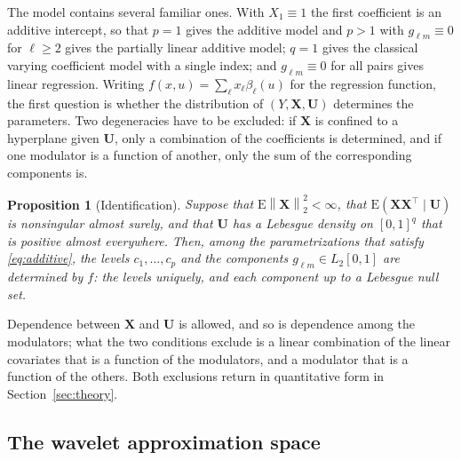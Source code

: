\documentclass[12pt]{article} %
\newtheorem{proposition}{Proposition}
\theoremstyle{definition}
\newcommand{\E}{\mathrm{E}}
\newcommand{\T}{^{\top}}
\newcommand{\norm}[1]{\left\lVert #1 \right\rVert}
\newcommand{\cv}{\ell}
\newcommand{\md}{m}
\newcommand{\bX}{\mathbf{X}}
\newcommand{\bU}{\mathbf{U}}
\newcommand{\fcoef}[1]{\beta_{#1}}
\newcommand{\lvl}[1]{c_{#1}}
\newcommand{\gcomp}[2]{g_{#1#2}}
\begin{document}
The model contains several familiar ones. With $X_1 \equiv 1$ the first
coefficient is an additive intercept, so that $p = 1$ gives the additive model
and $p > 1$ with $\gcomp{\cv}{\md} \equiv 0$ for $\cv \ge 2$ gives the
partially linear additive model; $q = 1$ gives the classical varying
coefficient model with a single index; and $\gcomp{\cv}{\md}\equiv 0$ for all
pairs gives linear regression. Writing
$f(x,u) = \sum_{\cv} x_{\cv}\fcoef{\cv}(u)$ for the regression function, the
first question is whether the distribution of $(Y,\bX,\bU)$ determines the
parameters. Two degeneracies have to be excluded: if $\bX$ is confined to a
hyperplane given $\bU$, only a combination of the coefficients is determined,
and if one modulator is a function of another, only the sum of the
corresponding components is.

\begin{proposition}[Identification]
\label{prop:identif}
Suppose that $\E\norm{\bX}_2^2 < \infty$, that $\E(\bX\bX\T \mid \bU)$ is
nonsingular almost surely, and that $\bU$ has a Lebesgue density on $[0,1]^q$
that is positive almost everywhere. Then, among the parametrizations that
satisfy \eqref{eq:additive}, the levels $\lvl{1},\dots,\lvl{p}$ and the
components $\gcomp{\cv}{\md} \in L_2[0,1]$ are determined by $f$: the levels
uniquely, and each component up to a Lebesgue null set.
\end{proposition}

Dependence between $\bX$ and $\bU$ is allowed, and so is dependence among the
modulators; what the two conditions exclude is a linear combination of the
linear covariates that is a function of the modulators, and a modulator that
is a function of the others. Both exclusions return in quantitative form in
Section~\ref{sec:theory}.

\subsection{The wavelet \texorpdfstring{\textcolor{colR1}{approximation space}}{approximation space}}
\label{sec:sieve}
\end{document}
